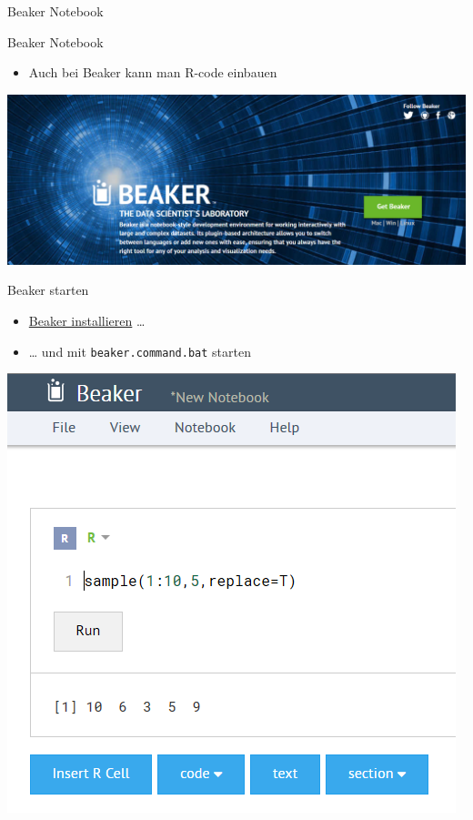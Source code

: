 \documentclass[ignorenonframetext,]{beamer}
\providecommand{\tightlist}{%
\setlength{\itemsep}{0pt}\setlength{\parskip}{0pt}}
\begin{document}
\begin{frame}[fragile]{Beaker Notebook}

\begin{block}{Beaker Notebook}

\begin{itemize}
\tightlist
\item
  Auch bei Beaker kann man R-code einbauen
\end{itemize}

\includegraphics{./tex2pdf.9796/b0d19f446dabaf3aec00ac06ef2f7408cc7419c5.png}

\end{block}

\begin{block}{Beaker starten}

\begin{itemize}
\tightlist
\item
  \href{http://beakernotebook.com/getting-started}{Beaker installieren}
  \ldots{}
\item
  \ldots{} und mit \texttt{beaker.command.bat} starten
\end{itemize}

\includegraphics{./tex2pdf.9796/3f371346f4471e3d18dda6bf16889a99becd3633.png}


\end{block}
\end{frame}
\end{document}
